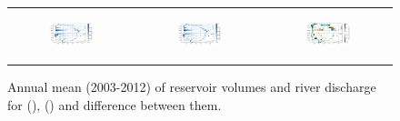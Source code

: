 \begin{figure}[htbp]
\begin{tabular}{ccc}
        \begin{subfigure}[b]{0.33\textwidth}
            \caption{}
            \includegraphics[width=\linewidth]{images/eval_halfdeg/maps/hydrographs_subgrid.png}
        \end{subfigure} &
        \begin{subfigure}[b]{0.33\textwidth}
            \caption{}
            \includegraphics[width=\linewidth]{images/eval_halfdeg/maps/hydrographs_interp.png}
        \end{subfigure} &
        \begin{subfigure}[b]{0.33\textwidth}
            \caption{}
            \includegraphics[width=\linewidth]{images/eval_halfdeg/maps/hydrographs_diff.png}
        \end{subfigure} \\
    \end{tabular}
    \caption{Annual mean (2003-2012) of reservoir volumes and river discharge for \std (\noirr), \native (\noirr) and difference between them.}
    \label{fig:routing_reservoirs_halfdeg}
\end{figure}

